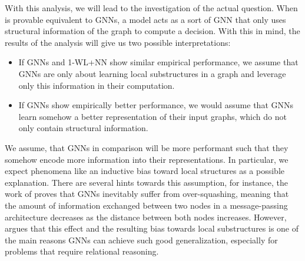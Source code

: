 \documentclass[11pt, dvipsnames, DIV=12]{scrreprt}
\theoremstyle{definition}
\newcommand{\wlnn}{\text{1-WL+NN }}
\begin{document}
With this analysis, we will lead to the investigation of the actual question. When \wlnn is provable equivalent to GNNs, a \wlnn model acts as a sort of GNN that only uses structural information of the graph to compute a decision. With this in mind, the results of the analysis will give us two possible interpretations:
\begin{itemize}
    \item If GNNs and 1-WL+NN show similar empirical performance, we assume that GNNs are only about learning local substructures in a graph and leverage only this information in their computation.
    \item If GNNs show empirically better performance, we would assume that GNNs learn somehow a better representation of their input graphs, which do not only contain structural information.
\end{itemize}
We assume, that GNNs in comparison will be more performant such that they somehow encode more information into their representations. In particular, we expect phenomena like an inductive bias toward local structures as a possible explanation. There are several hints towards this assumption, for instance, the work of \cite{Giovanni2023} proves that GNNs inevitably suffer from over-squashing, meaning that the amount of information exchanged between two nodes in a message-passing architecture decreases as the distance between both nodes increases. However, \cite{Vignac2020} argues that this effect and the resulting bias towards local substructures is one of the main reasons GNNs can achieve such good generalization, especially for problems that require relational reasoning.



\end{document}
